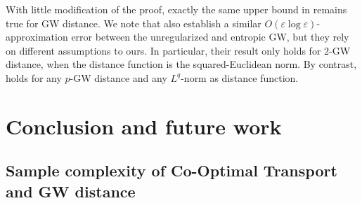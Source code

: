 With little modification of the proof, exactly the same upper bound in 
remains true for GW distance. We note that \citep{Zhang23} also establish a similar
$O(\varepsilon \log \varepsilon)$-approximation error between the unregularized and entropic GW,
but they rely on different assumptions to ours. In particular, their result only holds
for $2$-GW distance, when the distance function is the squared-Euclidean norm. By contrast,
 holds for any $p$-GW distance and any $L^q$-norm as distance function.

\section{Conclusion and future work}



\subsection{Sample complexity of Co-Optimal Transport and GW distance}
